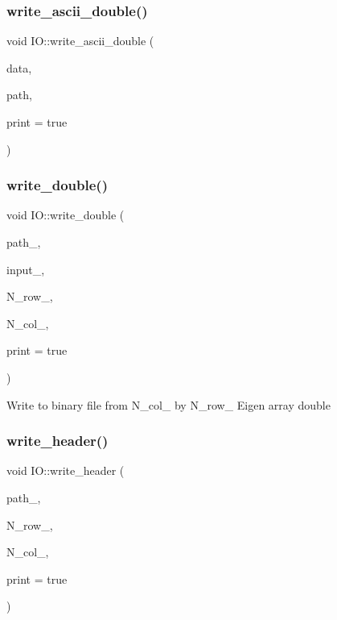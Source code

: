 \subsubsection{\texorpdfstring{write\_ascii\_double()}{write\_ascii\_double()}}
{\footnotesize\ttfamily void I\+O\+::write\+\_\+ascii\+\_\+double (\begin{DoxyParamCaption}\item[{Array\+Xd}]{data,  }\item[{std\+::string}]{path,  }\item[{bool}]{print = {\ttfamily true} }\end{DoxyParamCaption})}

\mbox{\label{class_i_o_a9a648215dc5e33abe2c5a8916fff06d4}} 
\subsubsection{\texorpdfstring{write\_double()}{write\_double()}}
{\footnotesize\ttfamily void I\+O\+::write\+\_\+double (\begin{DoxyParamCaption}\item[{const std\+::string}]{path\+\_\+,  }\item[{Array\+X\+Xd}]{input\+\_\+,  }\item[{int}]{N\+\_\+row\+\_\+,  }\item[{int}]{N\+\_\+col\+\_\+,  }\item[{bool}]{print = {\ttfamily true} }\end{DoxyParamCaption})}

Write to binary file from N\+\_\+col\+\_\+ by N\+\_\+row\+\_\+ Eigen array double\mbox{\label{class_i_o_a0db950886bb1e6d5571330f771974c4e}} 
\subsubsection{\texorpdfstring{write\_header()}{write\_header()}}
{\footnotesize\ttfamily void I\+O\+::write\+\_\+header (\begin{DoxyParamCaption}\item[{const std\+::string}]{path\+\_\+,  }\item[{int}]{N\+\_\+row\+\_\+,  }\item[{int}]{N\+\_\+col\+\_\+,  }\item[{bool}]{print = {\ttfamily true} }\end{DoxyParamCaption})}

